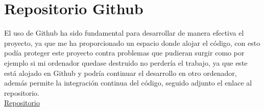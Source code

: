 \chapter{Repositorio Github }\label{Int}
\fancyhf{}%
\fancyfoot[L]{\thepage} 
El uso de Github ha sido fundamental para desarrollar de manera efectiva el proyecto, ya que me ha proporcionado un espacio donde alojar el código, con esto podía proteger este proyecto contra problemas que pudieran surgir como por ejemplo si mi ordenador quedase destruido no perdería el trabajo, ya que este está alojado en Github y podría continuar el desarrollo en otro ordenador, además permite la integración continua del código, seguido adjunto el enlace al repositorio.\\
\href{https://github.com/aitormorais/TrabajoFinGrado}{Repositorio}